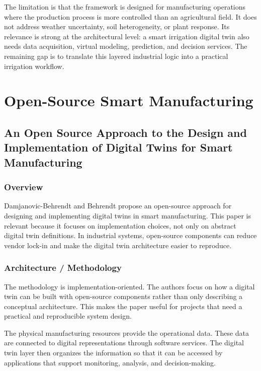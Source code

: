 The limitation is that the framework is designed for manufacturing operations where the production process is more controlled than an agricultural field. It does not address weather uncertainty, soil heterogeneity, or plant response. Its relevance is strong at the architectural level: a smart irrigation digital twin also needs data acquisition, virtual modeling, prediction, and decision services. The remaining gap is to translate this layered industrial logic into a practical irrigation workflow.

\section{Open-Source Smart Manufacturing}

\subsection[An Open Source Approach to the Design and Implementation of Digital Twins for Smart Manufacturing]{An Open Source Approach to the Design and Implementation of Digital Twins for Smart Manufacturing \cite{damjanovic2019openSourceDigitalTwins}}

\subsubsection{Overview}

Damjanovic-Behrendt and Behrendt propose an open-source approach for designing and implementing digital twins in smart manufacturing. This paper is relevant because it focuses on implementation choices, not only on abstract digital twin definitions. In industrial systems, open-source components can reduce vendor lock-in and make the digital twin architecture easier to reproduce.

\subsubsection{Architecture / Methodology}

The methodology is implementation-oriented. The authors focus on how a digital twin can be built with open-source components rather than only describing a conceptual architecture. This makes the paper useful for projects that need a practical and reproducible system design.

The physical manufacturing resources provide the operational data. These data are connected to digital representations through software services. The digital twin layer then organizes the information so that it can be accessed by applications that support monitoring, analysis, and decision-making.

